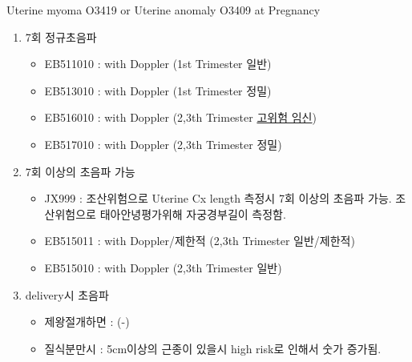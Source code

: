 \par
\clearpage
\begin{commentbox}{Uterine myoma O3419 or Uterine anomaly O3409  at Pregnancy}
\begin{enumerate}\tightlist
\item 7회 정규초음파
	\begin{itemize}\tightlist
	\item EB511010 : with Doppler (1st Trimester 일반) 
	\item EB513010 : with Doppler (1st Trimester 정밀) 
	\item EB516010 : with Doppler (2,3th Trimester \uline{고위험 임신}) 
	\item EB517010 : with Doppler (2,3th Trimester 정밀) 
	\end{itemize}
\item 7회 이상의 초음파 가능
	\begin{itemize}\tightlist
	\item JX999 : 조산위험으로 Uterine Cx length 측정시 7회 이상의 초음파 가능. 조산위험으로 태아안녕평가위해 자궁경부길이 측정함.
	\item EB515011 : with Doppler/제한적 (2,3th Trimester 일반/제한적)
	\item EB515010 : with Doppler (2,3th Trimester 일반)
	\end{itemize}	
\item delivery시 초음파
	\begin{itemize}\tightlist
	\item 제왕절개하면 : (-)
	\item 질식분만시 : 5cm이상의 근종이 있을시 high risk로 인해서 숫가 증가됨.
	\end{itemize}
\end{enumerate}
\end{commentbox}
\par
\medskip
\par
\medskip

